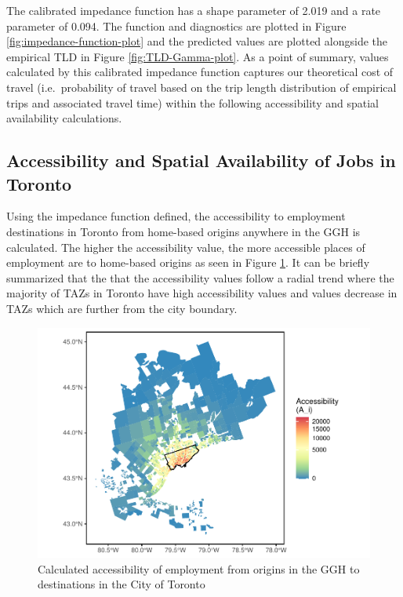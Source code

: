 \documentclass[]{elsarticle} %
\begin{document}
The calibrated impedance function has a shape parameter of 2.019 and a
rate parameter of 0.094. The function and diagnostics are plotted in
Figure \ref{fig:impedance-function-plot} and the predicted values are
plotted alongside the empirical TLD in Figure \ref{fig:TLD-Gamma-plot}.
As a point of summary, values calculated by this calibrated impedance
function captures our theoretical cost of travel (i.e.~probability of
travel based on the trip length distribution of empirical trips and
associated travel time) within the following accessibility and spatial
availability calculations.

\hypertarget{accessibility-and-spatial-availability-of-jobs-in-toronto}{%
\subsection{Accessibility and Spatial Availability of Jobs in
Toronto}\label{accessibility-and-spatial-availability-of-jobs-in-toronto}}

Using the impedance function defined, the accessibility to employment
destinations in Toronto from home-based origins anywhere in the GGH is
calculated. The higher the accessibility value, the more accessible
places of employment are to home-based origins as seen in Figure
\ref{fig:plot-accessibility-Toronto-TTS}. It can be briefly summarized
that the that the accessibility values follow a radial trend where the
majority of TAZs in Toronto have high accessibility values and values
decrease in TAZs which are further from the city boundary.

\begin{figure}
\includegraphics[width=1\linewidth]{Spatial-Availability_files/figure-latex/plot-accessibility-Toronto-TTS-1} \caption{\label{fig:plot-accessibility-Toronto-TTS}Calculated accessibility of employment from origins in the GGH to destinations in the City of Toronto}\label{fig:plot-accessibility-Toronto-TTS}
\end{figure}
\end{document}
